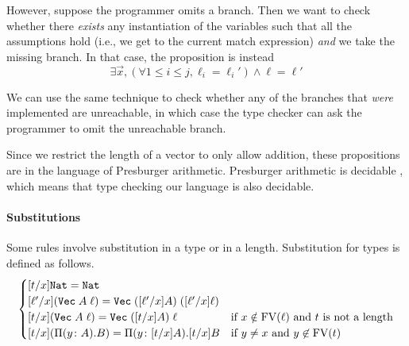 \documentclass[acmsmall,nonacm]{acmart}
\begin{document}
\noindent
However, suppose the programmer omits a branch.
Then we want to check whether there \emph{exists} any instantiation of the variables such that all the assumptions hold (i.e., we get to the current match expression) \emph{and} we take the missing branch.
In that case, the proposition is instead
\begin{equation*}
    \exists \vec{x} , \left(\forall 1 \leq i \leq j, \ell_i = \ell_i'\right) \land \ell = \ell'
\end{equation*}

\noindent
We can use the same technique to check whether any of the branches that \emph{were} implemented are unreachable, in which case the type checker can ask the programmer to omit the unreachable branch.

\label{sec:len-eq-decidable}
Since we restrict the length of a vector to only allow addition, these propositions are in the language of Presburger arithmetic.
Presburger arithmetic is decidable \cite{presburger-1929, haase-2018}, which means that type checking our language is also decidable.

\paragraph{Substitutions}
Some rules involve substitution in a type or in a length.
Substitution for types is defined as follows.
\begin{align*}
    \begin{cases}
        [t / x] \texttt{Nat} = \texttt{Nat} \\
        [\ell' / x] (\texttt{Vec} \; A \; \ell) = \texttt{Vec} \; ([\ell' / x]A) \; ([\ell' / x] \ell) \\
        [t / x] (\texttt{Vec} \; A \; \ell) = \texttt{Vec} \; ([t / x]A) \; \ell
            & \textnormal{if } x \notin \textnormal{FV}(\ell) \textnormal{ and $t$ is not a length} \\
        [t / x] (\Pi (y \colon A) . B) = \Pi (y \colon [t/x]A) . [t/x]B & \textnormal{if } y \neq x \textnormal{ and } y \not\in \textnormal{FV}(t)
    \end{cases}
\end{align*}
\end{document}
